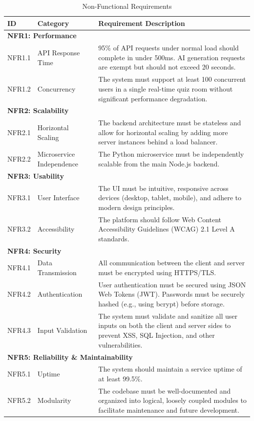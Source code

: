 \begin{table}[htbp]
\centering
\caption{Non-Functional Requirements}
\label{tab:non-func-req}
\begin{tabular}{l l p{8.5cm}}
\toprule
\textbf{ID} & \textbf{Category} & \textbf{Requirement Description} \\
\midrule
\multicolumn{3}{l}{\textbf{NFR1: Performance}} \\
\midrule
NFR1.1 & API Response Time & 95\% of API requests under normal load should complete in under 500ms. AI generation requests are exempt but should not exceed 20 seconds. \\
NFR1.2 & Concurrency & The system must support at least 100 concurrent users in a single real-time quiz room without significant performance degradation. \\
\midrule
\multicolumn{3}{l}{\textbf{NFR2: Scalability}} \\
\midrule
NFR2.1 & Horizontal Scaling & The backend architecture must be stateless and allow for horizontal scaling by adding more server instances behind a load balancer. \\
NFR2.2 & Microservice Independence & The Python microservice must be independently scalable from the main Node.js backend. \\
\midrule
\multicolumn{3}{l}{\textbf{NFR3: Usability}} \\
\midrule
NFR3.1 & User Interface & The UI must be intuitive, responsive across devices (desktop, tablet, mobile), and adhere to modern design principles. \\
NFR3.2 & Accessibility & The platform should follow Web Content Accessibility Guidelines (WCAG) 2.1 Level A standards. \\
\midrule
\multicolumn{3}{l}{\textbf{NFR4: Security}} \\
\midrule
NFR4.1 & Data Transmission & All communication between the client and server must be encrypted using HTTPS/TLS. \\
NFR4.2 & Authentication & User authentication must be secured using JSON Web Tokens (JWT). Passwords must be securely hashed (e.g., using bcrypt) before storage. \\
NFR4.3 & Input Validation & The system must validate and sanitize all user inputs on both the client and server sides to prevent XSS, SQL Injection, and other vulnerabilities. \\
\midrule
\multicolumn{3}{l}{\textbf{NFR5: Reliability \& Maintainability}} \\
\midrule
NFR5.1 & Uptime & The system should maintain a service uptime of at least 99.5\%. \\
NFR5.2 & Modularity & The codebase must be well-documented and organized into logical, loosely coupled modules to facilitate maintenance and future development. \\
\bottomrule
\end{tabular}
\end{table}

